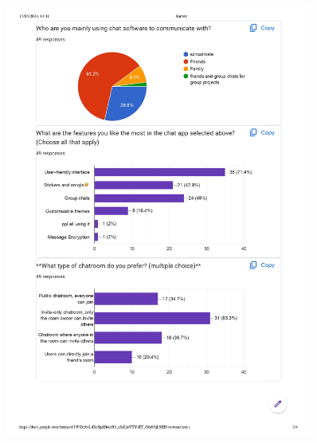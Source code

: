 \documentclass[12pt]{article}
\begin{document}
\begin{figure}[H]
    \centering
    \includegraphics[width=0.9\textwidth]{graphs/Survey-summary_page-0002.jpg}
\end{figure}
\end{document}
